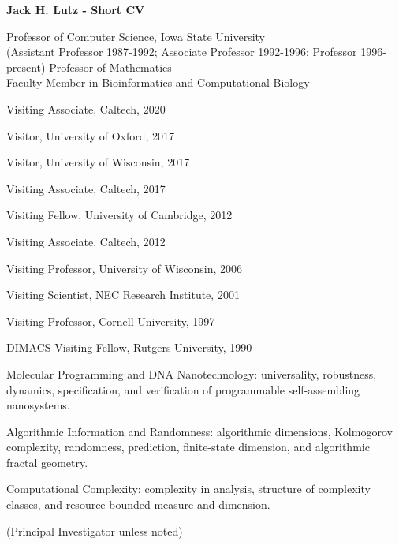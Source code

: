 \documentclass[12pt]{article}
\begin{document}
\begin{center}
{\bf Jack H. Lutz - Short CV}
\end{center}




Professor of Computer Science, Iowa State University  \\
\indent (Assistant Professor 1987-1992; Associate Professor 1992-1996; Professor 1996-present)
\indent Professor of Mathematics \\
\indent Faculty Member in Bioinformatics and Computational Biology 

\vspace{0.1cm}



\indent
Visiting Associate, Caltech, 2020

\indent
Visitor, University of Oxford, 2017

\indent
Visitor, University of Wisconsin, 2017

\indent
Visiting Associate, Caltech, 2017

\indent
Visiting Fellow, University of Cambridge, 2012

\indent
Visiting Associate, Caltech, 2012

\indent
Visiting Professor, University of Wisconsin, 2006


\indent Visiting Scientist, NEC Research Institute, 2001

\indent
Visiting Professor, Cornell University, 1997

\indent
DIMACS Visiting Fellow, Rutgers University, 1990


\vspace{0.2cm}


\indent
Molecular Programming and DNA Nanotechnology: universality,
robustness, dynamics, specification, and verification of
programmable self-assembling nanosystems.

\indent
Algorithmic Information and Randomness: algorithmic
dimensions, Kolmogorov complexity, randomness, prediction,
finite-state dimension, and algorithmic fractal geometry.

\indent
Computational Complexity: complexity in analysis, structure of 
complexity classes, and resource-bounded measure and dimension.


\vspace{0.2cm}
 (Principal Investigator unless noted)
\end{document}
